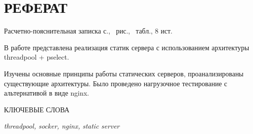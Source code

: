 \section*{РЕФЕРАТ}

Расчетно-пояснительная записка \pageref{LastPage} с., \totalfigures\ рис., \totaltables\ табл., 8 ист.

В работе представлена реализация статик сервера с использованием архитектуры threadpool + pselect.

Изучены основные принципы работы статических серверов, проанализированы существующие архитектуры. Было проведено нагрузочное тестирование с альтернативой в виде nginx. 

КЛЮЧЕВЫЕ СЛОВА

\textit{threadpool, socker, nginx, static server}

\clearpage